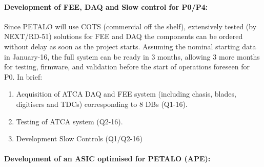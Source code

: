 \paragraph{Development of FEE, DAQ and Slow control for P0/P4:}

Since PETALO will use COTS (commercial off the shelf), extensively tested (by NEXT/RD-51) solutions for FEE and DAQ the components can be ordered without delay as soon as the project starts. Assuming the nominal starting data in January-16, the full system can be ready in 3 months, allowing 3 more months for testing, firmware, and validation before the start of operations foreseen for P0. In brief:  
\begin{enumerate}
\item Acquisition of ATCA DAQ and FEE system (including chasis, blades, digitisers and TDCs) corresponding to 8 DBs  (Q1-16).
\item Testing of ATCA system (Q2-16).
\item Development Slow Controls (Q1/Q2-16)
\end{enumerate}

%
%
%
%
\paragraph{Development of an ASIC optimised for PETALO (APE):}

